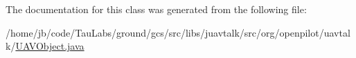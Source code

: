 \-The documentation for this class was generated from the following file\-:\begin{DoxyCompactItemize}
\item 
/home/jb/code/\-Tau\-Labs/ground/gcs/src/libs/juavtalk/src/org/openpilot/uavtalk/\hyperlink{_u_a_v_object_8java}{\-U\-A\-V\-Object.\-java}\end{DoxyCompactItemize}
